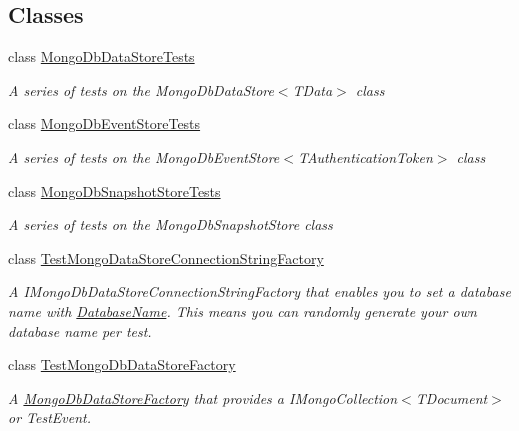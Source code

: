 \subsection*{Classes}
\begin{DoxyCompactItemize}
\item 
class \hyperlink{classCqrs_1_1MongoDB_1_1Tests_1_1Integration_1_1MongoDbDataStoreTests}{Mongo\+Db\+Data\+Store\+Tests}
\begin{DoxyCompactList}\small\item\em A series of tests on the Mongo\+Db\+Data\+Store$<$\+T\+Data$>$ class \end{DoxyCompactList}\item 
class \hyperlink{classCqrs_1_1MongoDB_1_1Tests_1_1Integration_1_1MongoDbEventStoreTests}{Mongo\+Db\+Event\+Store\+Tests}
\begin{DoxyCompactList}\small\item\em A series of tests on the Mongo\+Db\+Event\+Store$<$\+T\+Authentication\+Token$>$ class \end{DoxyCompactList}\item 
class \hyperlink{classCqrs_1_1MongoDB_1_1Tests_1_1Integration_1_1MongoDbSnapshotStoreTests}{Mongo\+Db\+Snapshot\+Store\+Tests}
\begin{DoxyCompactList}\small\item\em A series of tests on the Mongo\+Db\+Snapshot\+Store class \end{DoxyCompactList}\item 
class \hyperlink{classCqrs_1_1MongoDB_1_1Tests_1_1Integration_1_1TestMongoDataStoreConnectionStringFactory}{Test\+Mongo\+Data\+Store\+Connection\+String\+Factory}
\begin{DoxyCompactList}\small\item\em A I\+Mongo\+Db\+Data\+Store\+Connection\+String\+Factory that enables you to set a database name with \hyperlink{classCqrs_1_1MongoDB_1_1Tests_1_1Integration_1_1TestMongoDataStoreConnectionStringFactory_a2d26a00fd14aad6718b48d515ac30ff9_a2d26a00fd14aad6718b48d515ac30ff9}{Database\+Name}. This means you can randomly generate your own database name per test. \end{DoxyCompactList}\item 
class \hyperlink{classCqrs_1_1MongoDB_1_1Tests_1_1Integration_1_1TestMongoDbDataStoreFactory}{Test\+Mongo\+Db\+Data\+Store\+Factory}
\begin{DoxyCompactList}\small\item\em A \hyperlink{classCqrs_1_1MongoDB_1_1Factories_1_1MongoDbDataStoreFactory_a5306704647ba6dab35844231ca999b7e_a5306704647ba6dab35844231ca999b7e}{Mongo\+Db\+Data\+Store\+Factory} that provides a I\+Mongo\+Collection$<$\+T\+Document$>$ or Test\+Event. \end{DoxyCompactList}\item 

\end{DoxyCompactItemize}
